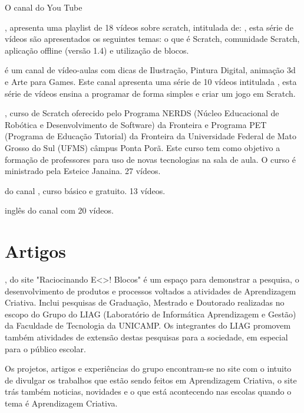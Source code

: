 \documentclass[12pt,fleqn]{book} %
\begin{document}
O canal do You Tube {, apresenta uma playlist de 18 vídeos sobre scratch, intitulada de: , esta série de vídeos são apresentados os seguintes temas: o que é Scratch, comunidade Scratch, aplicação offline (versão 1.4) e utilização de blocos.
	
 é um canal de vídeo-aulas com dicas de Ilustração, Pintura Digital, animação 3d e Arte para Games. Este canal apresenta uma série de 10 vídeos intitulada , esta série de vídeos ensina a programar de forma simples e criar um jogo em Scratch. 
	
, curso de Scratch oferecido pelo Programa NERDS (Núcleo Educacional de Robótica e Desenvolvimento de Software) da Fronteira e Programa PET (Programa de Educação Tutorial) da Fronteira da Universidade Federal de Mato Grosso do Sul (UFMS) câmpus Ponta Porã. Este curso tem como objetivo a formação de professores para uso de novas tecnologias na sala de aula. O curso é ministrado pela Esteice Janaina. 27 vídeos.
	
 do canal , curso básico e gratuito. 13 vídeos. 
	
 inglês do canal  com 20 vídeos.

\section{Artigos}

, do site "Raciocinando E<>! Blocos" é um espaço para demonstrar a pesquisa, o desenvolvimento de produtos e processos voltados a atividades de Aprendizagem Criativa. Inclui pesquisas de Graduação, Mestrado e Doutorado realizadas no escopo do Grupo do LIAG (Laboratório de Informática Aprendizagem e Gestão) da Faculdade de Tecnologia da UNICAMP. Os integrantes do LIAG promovem também atividades de extensão destas pesquisas para a sociedade, em especial para o público escolar.

Os projetos, artigos e experiências do grupo encontram-se no site com o intuito de divulgar os trabalhos que estão sendo feitos em Aprendizagem Criativa, o site trás também noticias, novidades e o que está acontecendo nas escolas quando o tema é Aprendizagem Criativa.

}
\end{document}
